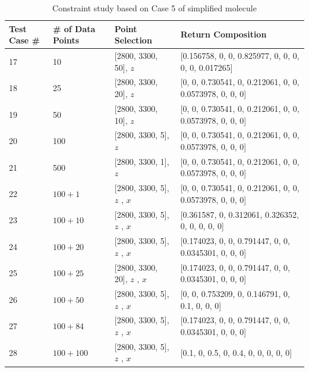 \begin{table} \tiny 
\begin{center}
\begin{tabular}{| p{2cm} | p{2cm} | p{4cm}  | l |}
\hline
Test Case \# & \# of Data Points & Point Selection & Return Composition \\ \hline
17 & 10 & [2800, 3300, 50], $z$ & [0.156758, 0, 0, 0.825977, 0, 0, 0, 0, 0, 0.017265] \\ \hline
18 & 25 & [2800, 3300, 20], $z$ & [0, 0, 0.730541, 0, 0.212061, 0, 0, 0.0573978, 0, 0, 0] \\ \hline
19 & 50 & [2800, 3300, 10], $z$ & [0, 0, 0.730541, 0, 0.212061, 0, 0, 0.0573978, 0, 0, 0] \\ \hline
20 & 100 & [2800, 3300, 5], $z$ & [0, 0, 0.730541, 0, 0.212061, 0, 0, 0.0573978, 0, 0, 0] \\ \hline
21 & 500 & [2800, 3300, 1], $z$ & [0, 0, 0.730541, 0, 0.212061, 0, 0, 0.0573978, 0, 0, 0] \\ \hline	
22 & $100 + 1$ & [2800, 3300, 5], $z$ \newline [2800, 3300, 500], $x$  & [0, 0, 0.730541, 0, 0.212061, 0, 0, 0.0573978, 0, 0, 0] \\ \hline
23 & $100 + 10$ & [2800, 3300, 5], $z$ \newline [2800, 3300, 50], $x$  & [0.361587, 0, 0.312061, 0.326352, 0, 0, 0, 0, 0] \\ \hline
24 & $100 + 20$ & [2800, 3300, 5], $z$ \newline [2800, 3300, 25], $x$  & [0.174023, 0, 0, 0.791447, 0, 0, 0.0345301, 0, 0, 0] \\ \hline
25 & $100 + 25$ & [2800, 3300, 20], $z$ \newline [2800, 3300, 20], $x$  & [0.174023, 0, 0, 0.791447, 0, 0, 0.0345301, 0, 0, 0] \\ \hline
26 & $100 + 50$ & [2800, 3300, 5], $z$ \newline [2800, 3300, 10], $x$  & [0, 0, 0.753209, 0, 0.146791, 0, 0.1, 0, 0, 0] \\ \hline
27 & $100 + 84$ & [2800, 3300, 5], $z$ \newline [2800, 3300, 6], $x$  & [0.174023, 0, 0, 0.791447, 0, 0, 0.0345301, 0, 0, 0] \\ \hline
28 & $100 + 100$ & [2800, 3300, 5], $z$ \newline [2800, 3300, 5], $x$  & [0.1, 0, 0.5, 0, 0.4, 0, 0, 0, 0, 0] \\ 
\hline
\end{tabular} \\
\caption{Constraint study based on Case 5 of simplified molecule}\label{tab:3.5}
\end{center}
\end{table}

